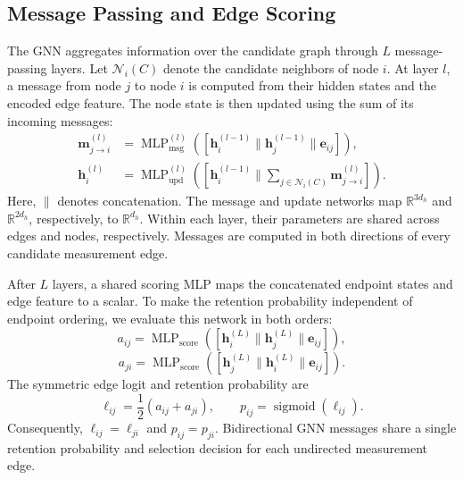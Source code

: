 \subsection{Message Passing and Edge Scoring}
\label{sec:edge_scoring}
The GNN aggregates information over the candidate graph through $L$ message-passing layers. Let $\mathcal N_i(C)$ denote the candidate neighbors of node $i$. At layer $l$, a message from node $j$ to node $i$ is computed from their hidden states and the encoded edge feature. The node state is then updated using the sum of its incoming messages:
\begin{align}
    \mathbf m_{j\rightarrow i}^{(l)}
    &=
    \operatorname{MLP}_{\mathrm{msg}}^{(l)}
    \left(
    \left[
    \mathbf h_i^{(l-1)}
    \parallel
    \mathbf h_j^{(l-1)}
    \parallel
    \mathbf e_{ij}
    \right]
    \right),
    \label{eq:message_passing}\\
    \mathbf h_i^{(l)}
    &=
    \operatorname{MLP}_{\mathrm{upd}}^{(l)}
    \left(
    \left[
    \mathbf h_i^{(l-1)}
    \parallel
    \sum_{j\in\mathcal N_i(C)}
    \mathbf m_{j\rightarrow i}^{(l)}
    \right]
    \right).
    \label{eq:node_update}
\end{align}
Here, $\parallel$ denotes concatenation. The message and update networks map $\mathbb R^{3d_h}$ and $\mathbb R^{2d_h}$, respectively, to $\mathbb R^{d_h}$. Within each layer, their parameters are shared across edges and nodes, respectively. Messages are computed in both directions of every candidate measurement edge.

After $L$ layers, a shared scoring MLP maps the concatenated endpoint states and edge feature to a scalar. To make the retention probability independent of endpoint ordering, we evaluate this network in both orders:
\[
    a_{ij}
    =
    \operatorname{MLP}_{\mathrm{score}}
    \left(
    \left[
    \mathbf h_i^{(L)}
    \parallel
    \mathbf h_j^{(L)}
    \parallel
    \mathbf e_{ij}
    \right]
    \right),
\]
\[
    a_{ji}
    =
    \operatorname{MLP}_{\mathrm{score}}
    \left(
    \left[
    \mathbf h_j^{(L)}
    \parallel
    \mathbf h_i^{(L)}
    \parallel
    \mathbf e_{ij}
    \right]
    \right).
\]
The symmetric edge logit and retention probability are
\[
    \ell_{ij}
    =
    \frac12(a_{ij}+a_{ji}),
    \qquad
    p_{ij}
    =
    \operatorname{sigmoid}(\ell_{ij}).
\]
Consequently, $\ell_{ij}=\ell_{ji}$ and $p_{ij}=p_{ji}$. Bidirectional GNN messages share a single retention probability and selection decision for each undirected measurement edge.

